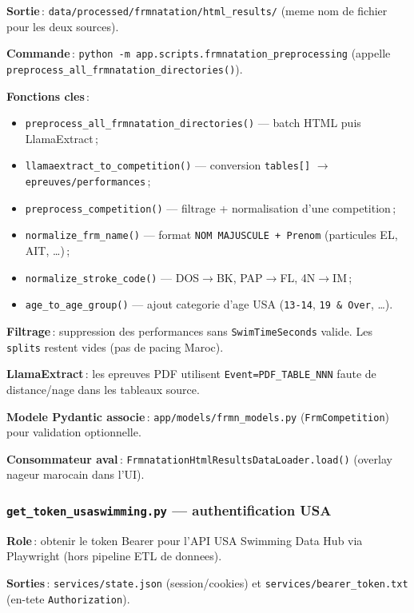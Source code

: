 \documentclass[11pt,a4paper]{article}
\begin{document}
\textbf{Sortie}\,: \texttt{data/processed/frmnatation/html\_results/} (meme nom de fichier pour les deux sources).

\textbf{Commande}\,: \texttt{python -m app.scripts.frmnatation\_preprocessing} (appelle \texttt{preprocess\_all\_frmnatation\_directories()}).

\textbf{Fonctions cles}\,:
\begin{itemize}
  \item \texttt{preprocess\_all\_frmnatation\_directories()} --- batch HTML puis LlamaExtract\,;
  \item \texttt{llamaextract\_to\_competition()} --- conversion \texttt{tables[]} $\rightarrow$ \texttt{epreuves/performances}\,;
  \item \texttt{preprocess\_competition()} --- filtrage + normalisation d'une competition\,;
  \item \texttt{normalize\_frm\_name()} --- format \texttt{NOM MAJUSCULE + Prenom} (particules EL, AIT, \ldots)\,;
  \item \texttt{normalize\_stroke\_code()} --- DOS$\rightarrow$BK, PAP$\rightarrow$FL, 4N$\rightarrow$IM\,;
  \item \texttt{age\_to\_age\_group()} --- ajout categorie d'age USA (\texttt{13-14}, \texttt{19 \& Over}, \ldots).
\end{itemize}

\textbf{Filtrage}\,: suppression des performances sans \texttt{SwimTimeSeconds} valide. Les \texttt{splits} restent vides (pas de pacing Maroc).

\textbf{LlamaExtract}\,: les epreuves PDF utilisent \texttt{Event=PDF\_TABLE\_NNN} faute de distance/nage dans les tableaux source.

\textbf{Modele Pydantic associe}\,: \texttt{app/models/frmn\_models.py} (\texttt{FrmCompetition}) pour validation optionnelle.

\textbf{Consommateur aval}\,: \texttt{FrmnatationHtmlResultsDataLoader.load()} (overlay nageur marocain dans l'UI).

\subsubsection{\texttt{get\_token\_usaswimming.py} --- authentification USA}

\textbf{Role}\,: obtenir le token Bearer pour l'API USA Swimming Data Hub via Playwright (hors pipeline ETL de donnees).

\textbf{Sorties}\,: \texttt{services/state.json} (session/cookies) et \texttt{services/bearer\_token.txt} (en-tete \texttt{Authorization}).
\end{document}
